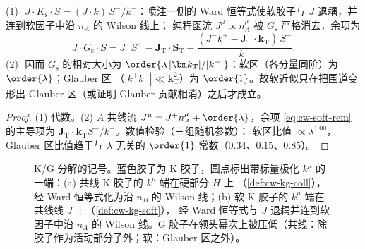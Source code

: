 \begin{proposition}\label{prop:cw-kg-soft}
(1)\,\tagR\ $J\cdot K_{\mathrm s}\cdot S=(J\cdot k)\,S^-/k^-$：喷注一侧的 Ward 恒等式使软胶子与 $J$ 退耦，并连到软因子中沿 $n_A$ 的 Wilson 线上；
纯程函流 $J^\mu\propto n_A^\mu$ 被 $G_{\mathrm s}$ 严格消去，余项为
\begin{equation}\label{eq:cw-soft-rem}
J\cdot G_{\mathrm s}\cdot S=J^-S^+-\bm J_{\mathrm T}\cdot\bm S_{\mathrm T}-\frac{(J^-k^+-\bm J_{\mathrm T}\cdot\bm k_{\mathrm T})\,S^-}{k^-}.
\end{equation}
(2)\,\tagA\ 因而 $G_{\mathrm s}$ 的相对大小为 $\order{\lambda\,|\bm k_{\mathrm T}|/|k^-|}$：软区（各分量同阶）为 $\order{\lambda}$；Glauber 区
（$|k^+k^-|\ll\bm k_{\mathrm T}^2$）为 $\order{1}$。故软近似只在把围道变形出 Glauber 区（或证明 Glauber 贡献相消）之后才成立。
\end{proposition}

\begin{proof}
(1) 代数。(2) $A$ 共线流 $J^\mu=J^+n_A^\mu+\order{\lambda}$，余项 \cref{eq:cw-soft-rem} 的主导项为 $\bm J_{\mathrm T}\cdot\bm k_{\mathrm T}S^-/k^-$。数值检验（三组随机参数）：
软区比值 $\propto\lambda^{1.00}$，Glauber 区比值趋于与 $\lambda$ 无关的 $\order{1}$ 常数（0.34、0.15、0.85）。
\end{proof}

\begin{figure}[htbp]
\centering
{}
\caption{K/G 分解的记号。蓝色胶子为 K 胶子，圆点标出带标量极化 $k^\mu$ 的一端：(a) 共线 K 胶子的 $k^\mu$ 端在硬部分 $H$ 上
（\cref{def:cw-kg-coll}），经 Ward 恒等式化为沿 $n_B$ 的 Wilson 线；(b) 软 K 胶子的 $k^\mu$ 端在共线线 $J$ 上（\cref{def:cw-kg-soft}），
经 Ward 恒等式与 $J$ 退耦并连到软因子中沿 $n_A$ 的 Wilson 线。G 胶子在领头幂次上被压低（共线：除胶子作为活动部分子外；软：Glauber 区之外）。}\label{fig:cw-kg}
\end{figure}

